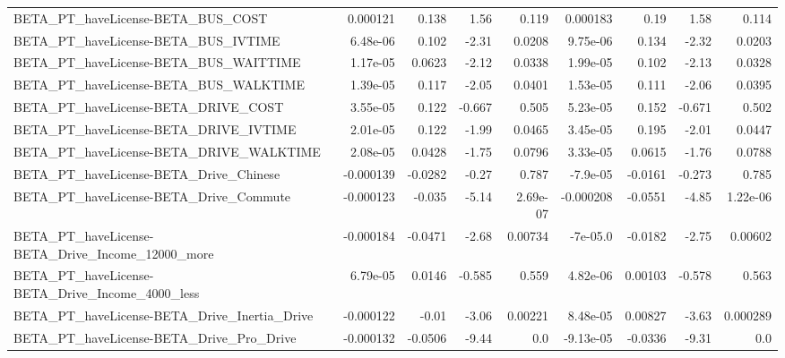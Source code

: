 \begin{tabular}{lrrrrrrrr}
BETA\_PT\_haveLicense-BETA\_BUS\_COST                  &    0.000121 &        0.138 &     1.56 &    0.119 &   0.000183 &        0.19 &         1.58 &         0.114 \\
BETA\_PT\_haveLicense-BETA\_BUS\_IVTIME                &    6.48e-06 &        0.102 &    -2.31 &   0.0208 &   9.75e-06 &       0.134 &        -2.32 &        0.0203 \\
BETA\_PT\_haveLicense-BETA\_BUS\_WAITTIME              &    1.17e-05 &       0.0623 &    -2.12 &   0.0338 &   1.99e-05 &       0.102 &        -2.13 &        0.0328 \\
BETA\_PT\_haveLicense-BETA\_BUS\_WALKTIME              &    1.39e-05 &        0.117 &    -2.05 &   0.0401 &   1.53e-05 &       0.111 &        -2.06 &        0.0395 \\
BETA\_PT\_haveLicense-BETA\_DRIVE\_COST                &    3.55e-05 &        0.122 &   -0.667 &    0.505 &   5.23e-05 &       0.152 &       -0.671 &         0.502 \\
BETA\_PT\_haveLicense-BETA\_DRIVE\_IVTIME              &    2.01e-05 &        0.122 &    -1.99 &   0.0465 &   3.45e-05 &       0.195 &        -2.01 &        0.0447 \\
BETA\_PT\_haveLicense-BETA\_DRIVE\_WALKTIME            &    2.08e-05 &       0.0428 &    -1.75 &   0.0796 &   3.33e-05 &      0.0615 &        -1.76 &        0.0788 \\
BETA\_PT\_haveLicense-BETA\_Drive\_Chinese             &   -0.000139 &      -0.0282 &    -0.27 &    0.787 &   -7.9e-05 &     -0.0161 &       -0.273 &         0.785 \\
BETA\_PT\_haveLicense-BETA\_Drive\_Commute             &   -0.000123 &       -0.035 &    -5.14 & 2.69e-07 &  -0.000208 &     -0.0551 &        -4.85 &      1.22e-06 \\
BETA\_PT\_haveLicense-BETA\_Drive\_Income\_12000\_more   &   -0.000184 &      -0.0471 &    -2.68 &  0.00734 &   -7e-05.0 &     -0.0182 &        -2.75 &       0.00602 \\
BETA\_PT\_haveLicense-BETA\_Drive\_Income\_4000\_less    &    6.79e-05 &       0.0146 &   -0.585 &    0.559 &   4.82e-06 &     0.00103 &       -0.578 &         0.563 \\
BETA\_PT\_haveLicense-BETA\_Drive\_Inertia\_Drive       &   -0.000122 &        -0.01 &    -3.06 &  0.00221 &   8.48e-05 &     0.00827 &        -3.63 &      0.000289 \\
BETA\_PT\_haveLicense-BETA\_Drive\_Pro\_Drive           &   -0.000132 &      -0.0506 &    -9.44 &      0.0 &  -9.13e-05 &     -0.0336 &        -9.31 &           0.0 \\

\end{tabular}
